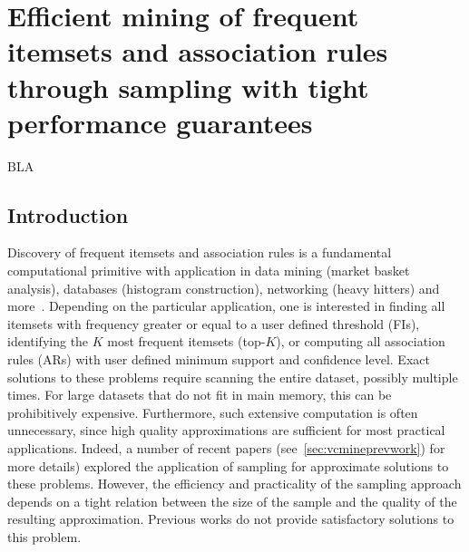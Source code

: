 \chapter{Efficient mining of frequent itemsets and association rules through
sampling with tight performance guarantees}\label{ch:vcmine}
BLA

\section{Introduction}\label{sec:vcmineintro}
Discovery of frequent itemsets and association rules is a fundamental
computational primitive with application in data mining (market basket
analysis), databases (histogram construction), networking (heavy hitters) and
more~\cite[Sect.~5]{HanCXY07}. Depending on the particular application, one is
interested in finding all itemsets with frequency greater or equal to a user
defined threshold (FIs), identifying the $K$ most frequent itemsets (top-$K$),
or computing all association rules (ARs) with user defined minimum  support and
confidence level. Exact solutions to these problems require scanning the entire
dataset, possibly multiple times. For large datasets that do not fit in main
memory, this can be prohibitively expensive. Furthermore, such extensive
computation is often unnecessary, since high quality approximations are
sufficient for most practical applications.  Indeed, a number of recent
papers (see~\ref{sec:vcmineprevwork}) for more details)
explored the application of sampling for approximate solutions to these
problems. However, the efficiency and practicality of the sampling approach
depends on a tight relation between the size of the sample and the quality of
the resulting approximation. Previous works do not provide satisfactory
solutions to this problem.

